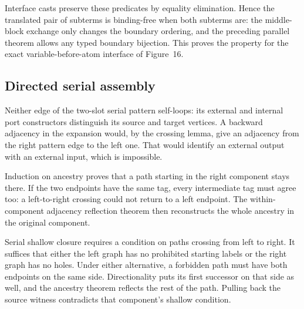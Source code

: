 Interface casts preserve these predicates by equality elimination. Hence
the translated pair of subterms is binding-free when both subterms are:
the middle-block exchange only changes the boundary ordering, and the
preceding parallel theorem allows any typed boundary bijection. This proves
the property for the exact variable-before-atom interface of Figure~16.













\subsection{Directed serial assembly}


Neither edge of the two-slot serial pattern self-loops: its external and
internal port constructors distinguish its source and target vertices.
A backward adjacency in the expansion would, by the crossing lemma, give
an adjacency from the right pattern edge to the left one. That would identify
an external output with an external input, which is impossible.

Induction on ancestry proves that a path starting in the right component
stays there. If the two endpoints have the same tag, every intermediate tag
must agree too: a left-to-right crossing could not return to a left endpoint.
The within-component adjacency reflection theorem then reconstructs the
whole ancestry in the original component.









Serial shallow closure requires a condition on paths crossing from left
to right. It suffices that either the left graph has no prohibited starting
labels or the right graph has no holes. Under either alternative, a forbidden
path must have both endpoints on the same side. Directionality puts its first
successor on that side as well, and the ancestry theorem reflects the rest
of the path. Pulling back the source witness contradicts that component's
shallow condition.


